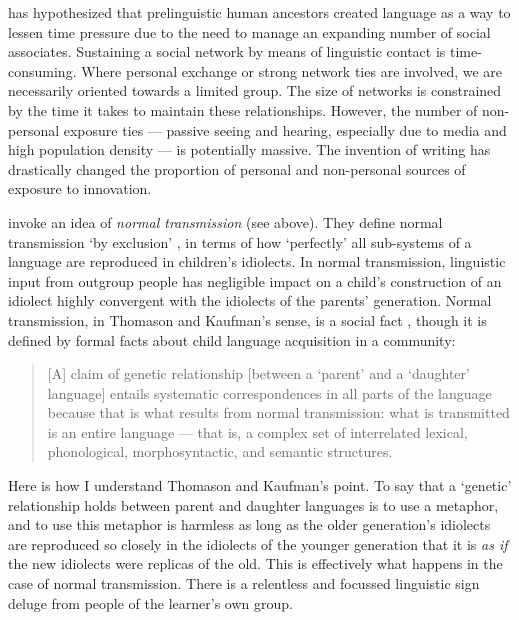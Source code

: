 \citet{dunbar_grooming_1996} has hypothesized that prelinguistic human ancestors created language as a way to lessen time pressure due to the need to manage an expanding number of social associates. Sustaining a social network by means of linguistic contact is time-consuming. Where personal exchange or strong network ties are involved, we are necessarily oriented towards a limited group. The size of networks is constrained by the time it takes to maintain these relationships. However, the number of non-personal exposure ties --- passive seeing and hearing, especially due to media and high population density --- is potentially massive. The invention of writing has drastically changed the proportion of personal and non-personal sources of exposure to innovation.

\citet{thomason_language_1988} invoke an idea of \textit{normal transmission} (see above). They define normal transmission \textquoteleft by exclusion' \citep[10]{thomason_language_1988}, in terms of how \textquoteleft perfectly' all sub-systems of a language are reproduced in children's idiolects. In normal transmission, linguistic input from outgroup people has negligible impact on a child's construction of an idiolect highly convergent with the idiolects of the parents' generation. 
Normal transmission, in Thomason and Kaufman's sense, is a social fact \citep[12]{thomason_language_1988}, though it is defined by formal facts about child language acquisition in a community:

\begin{quotation}
[A] claim of genetic relationship [between a \textquoteleft parent' and a \textquoteleft daughter' language] entails systematic correspondences in all parts of the language because that is what results from normal transmission: what is transmitted is an entire language --- that is, a complex set of interrelated lexical, phonological, morphosyntactic, and semantic structures. \citep[11]{thomason_language_1988}
\end{quotation}
	
Here is how I understand Thomason and Kaufman's point. To say that a \textquoteleft genetic' relationship holds between parent and daughter languages is to use a metaphor, and to use this metaphor is harmless as long as the older generation's idiolects are reproduced so closely in the idiolects of the younger generation that it is \textit{as if} the new idiolects were replicas of the old. This is effectively what happens in the case of normal transmission. There is a relentless and focussed linguistic sign deluge from people of the learner's own group.



